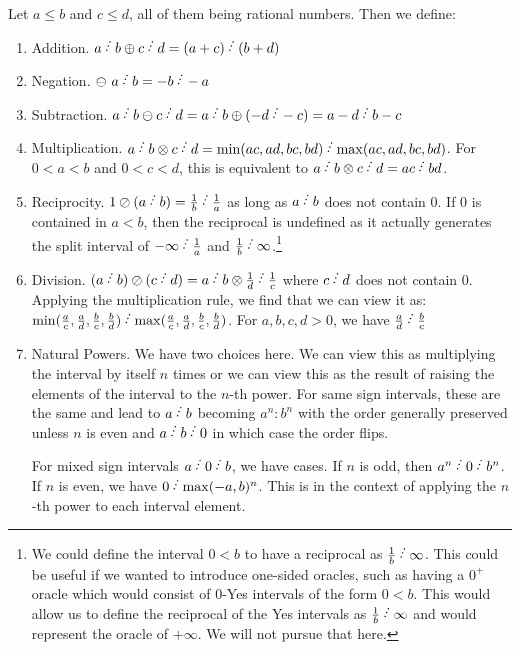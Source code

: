 \documentclass[12pt]{article}
\begin{document}
Let $a \leq b$ and $c \leq d$, all of them being rational numbers. Then we define:
\begin{enumerate}
    \item Addition. $a\lte b \oplus c\lte d = (a+c)\lte (b+d)$
    \item Negation. $\ominus\ a\lte b = -b\lte -a$
    \item Subtraction. $a\lte b \ominus c\lte d = a\lte b \oplus (-d\lte -c) = a-d\lte b-c$
    \item Multiplication. $a\lte b \otimes c\lte d = \min(ac, ad, bc, bd)\lte  \max(ac,ad,bc,bd)$. For $0<a<b$ and $0<c<d$, this is equivalent to $a\lte b \otimes c\lte d = ac\lte bd$. 
    \item Reciprocity. $1 \oslash (a\lte b) = \frac{1}{b}\lte \frac{1}{a}$ as long as $a\lte b$ does not contain 0. If 0 is contained in $a \lt b$, then the reciprocal is undefined as it actually generates the split interval of $-\infty\lte \frac{1}{a}$ and $\frac{1}{b}\lte \infty$.\footnote{We could define the interval $0 \lt b$ to have a reciprocal as $\frac{1}{b}\lte \infty$. This could be useful if we wanted to introduce one-sided oracles, such as having a $0^+$ oracle which would consist of $0$-Yes intervals of the form $0\lt b$. This would allow us to define the reciprocal of the Yes intervals as $\frac{1}{b}\lte \infty$ and would represent the oracle of $+ \infty$. We will not pursue that here.  }
    \item Division. $(a\lte b) \oslash (c\lte d) = a\lte b \otimes \frac{1}{d}\lte \frac{1}{c}$ where $c\lte d$ does not contain 0. Applying the multiplication rule, we find that we can view it as:   $\min(\frac{a}{c}, \frac{a}{d}, \frac{b}{c}, \frac{b}{d})\lte  \max(\frac{a}{c},\frac{a}{d},\frac{b}{c},\frac{b}{d})$. For $a, b, c, d > 0$, we have $\frac{a}{d} \lte  \frac{b}{c}$
    \item Natural Powers. We have two choices here. We can view this as multiplying the interval by itself $n$ times or we can view this as the result of raising the elements of the interval to the $n$-th power. For same sign intervals, these are the same and lead to $a\lte b$ becoming $a^n : b^n$  with the order generally preserved unless $n$ is even and $a \lte b \lte 0$ in which case the order flips. 
    
    For mixed sign intervals $a \lte 0 \lte b$, we have cases. If $n$ is odd, then $a^n \lte 0 \lte b^n$. If $n$ is even, we have $0 \lte \max(-a, b)^n$. This is in the context of applying the $n$-th power to each interval element.


\end{enumerate}
\end{document}
